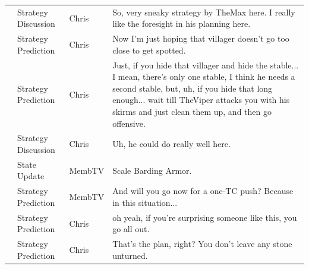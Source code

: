 {\begin{longtable}{@{}>{\theAppRow}r|L{2.3cm}L{1.0cm}U{11.55cm}@{}}
    & Strategy Discussion   & Chris        & So, very sneaky strategy by TheMax here. I really like the foresight in his planning here.                                                                                                                                                                       \\
    & Strategy Prediction   & Chris        & Now I'm just hoping that villager doesn't go too close to get spotted.                                                                                                                                                                                           \\
    & Strategy Prediction   & Chris        & Just, if you hide that villager and hide the stable... I mean, there's only one stable, I think he needs a second stable, but, uh, if you hide that long enough... wait till TheViper attacks you with his skirms and just clean them up, and then go offensive. \\
    & Strategy Discussion   & Chris        & Uh, he could do really well here.                                                                                                                                                                                                                                \\
    & State Update          & MembTV       & Scale Barding Armor.                                                                                                                                                                                                                                             \\
    & Strategy Prediction   & MembTV       & And will you go now for a one-TC push? Because in this situation...                                                                                                                                                                                              \\
    & Strategy Prediction   & Chris        & oh yeah, if you're surprising someone like this, you go all out.                                                                                                                                                                                                 \\
    & Strategy Prediction   & Chris        & That's the plan, right? You don't leave any stone unturned.                                                                                                                                                                                                      \\

\end{longtable}}
